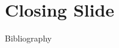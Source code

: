 \documentclass[aspectratio=169]{beamer}
\begin{document}
\section*{Closing Slide}

\begin{frame}
\end{frame}


\begin{frame}[allowframebreaks]{Bibliography}
  \printbibliography
\end{frame}
\end{document}
